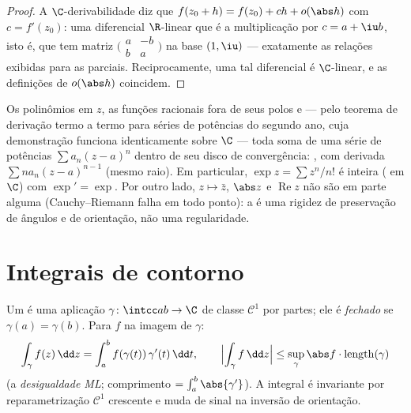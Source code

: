 \begin{proof}
A $\C$-derivabilidade diz que $f(z_0 + h) = f(z_0) + ch +
o(\abs h)$ com $c = f'(z_0)$: uma diferencial
$\R$-linear que é a multiplicação por $c = a + \iu b$, isto é, que tem matriz
$\bigl(\begin{smallmatrix} a & -b\\ b & a
\end{smallmatrix}\bigr)$ na base $(1, \iu)$ --- exatamente as relações exibidas para as parciais.
Reciprocamente, uma tal diferencial é $\C$-linear, e as definições de
$o(\abs h)$ coincidem.
\end{proof}

\begin{example}\label{ex:b3:holomorphic:examples}
Os polinômios em $z$, as funções racionais fora de seus polos e ---
pelo teorema de derivação termo a termo para séries de potências do
segundo ano, cuja demonstração funciona identicamente sobre $\C$ ---
toda soma de uma série de potências $\sum a_n(z - a)^n$ dentro de seu disco de
convergência: , com derivada $\sum na_n(z -
a)^{n-1}$ (mesmo raio). Em
particular, $\exp z = \sum z^n/n!$ é inteira ( em $\C$) com $\exp' = \exp$. Por outro
lado, $z \mapsto \bar z$, $\abs z$ e $\operatorname{Re}z$ não são  em parte alguma
(Cauchy--Riemann falha em todo ponto): a  é uma rigidez de
preservação de ângulos e de orientação, não uma regularidade.
\end{example}

\section{Integrais de contorno}

\begin{definition}\label{def:b3:holomorphic:contour}
Um \emph{} é uma aplicação $\gamma \colon
\intcc ab \to \C$ de classe $\mathcal C^1$ por partes; ele é
\emph{fechado} se $\gamma(a) =
\gamma(b)$. Para $f$  na imagem de
$\gamma$:
\[
\int_\gamma f(z)\,\dd z =
\int_a^b f(\gamma(t))\,\gamma'(t)\,\dd t,
\qquad
\Bigl|\int_\gamma f\,\dd z\Bigr| \leq
\sup_{\gamma}\abs f\cdot\operatorname{length}(\gamma)
\]
(a \emph{desigualdade ML}; comprimento $= \int_a^b\abs{\gamma'}$). A integral é invariante
por reparametrização $\mathcal C^1$ crescente e muda de sinal na inversão de
orientação.
\end{definition}

